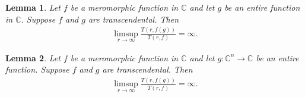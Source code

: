 \documentclass[11pt,reqno]{amsart}
\newtheorem{lem}{Lemma}[section]
\numberwithin{equation}{section}
\begin{document}
\begin{lem}\label{Lm1}\cite[pp. 78]{Clunie-1970} Let $f$ be a meromorphic function in $\mathbb{C}$ and let $g$ be an entire function in $\mathbb{C}$. Suppose $f$ and $g$ are transcendental. Then 
\begin{align*}
\limsup\limits_{r\to\infty}\frac{T(r,f(g))}{T(r,f)}=\infty.
\end{align*}
\end{lem}

\begin{lem}\label{Lm2} Let $f$ be a meromorphic function in $\mathbb{C}$ and let $g:\mathbb{C}^n\to \mathbb{C}$ be an entire function. Suppose $f$ and $g$ are transcendental. Then 
\begin{align*}
\limsup\limits_{r\to\infty}\frac{T(r,f(g))}{T(r,f)}=\infty.
\end{align*}
\end{lem}
\end{document}
